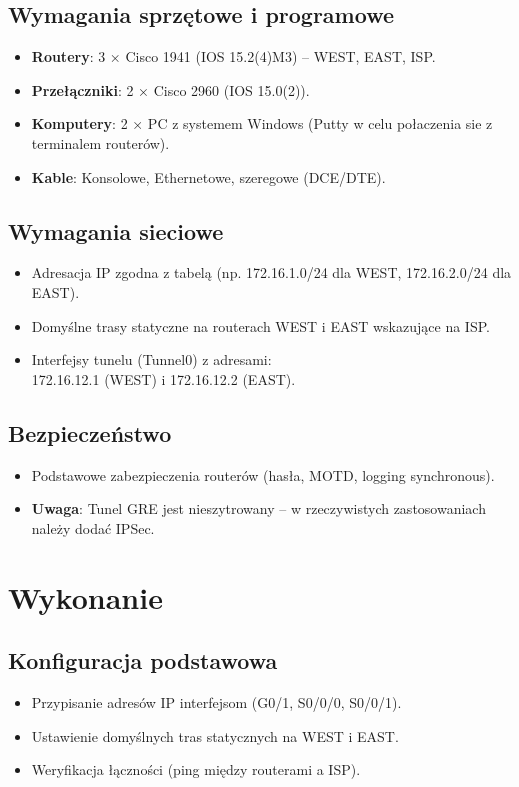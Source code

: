 \documentclass[12pt,twoside,a4paper,openany]{article}
\begin{document}
\clearpage
\subsection{Wymagania sprzętowe i programowe}
\begin{itemize}
    \item \textbf{Routery}: 3 × Cisco 1941 (IOS 15.2(4)M3) – WEST, EAST, ISP.
    \item \textbf{Przełączniki}: 2 × Cisco 2960 (IOS 15.0(2)).
    \item \textbf{Komputery}: 2 × PC z systemem Windows (Putty w celu połaczenia sie z terminalem routerów).
    \item \textbf{Kable}: Konsolowe, Ethernetowe, szeregowe (DCE/DTE).
\end{itemize}

\subsection{Wymagania sieciowe}
\begin{itemize}
    \item Adresacja IP zgodna z tabelą (np. 172.16.1.0/24 dla WEST, 172.16.2.0/24 dla EAST).    \item Domyślne trasy statyczne na routerach WEST i EAST wskazujące na ISP.
    \item Interfejsy tunelu (Tunnel0) z adresami:\\ 172.16.12.1 (WEST) i 172.16.12.2 (EAST).
\end{itemize}

\subsection{Bezpieczeństwo}
\begin{itemize}
    \item Podstawowe zabezpieczenia routerów (hasła, MOTD, logging synchronous).
    \item \textbf{Uwaga}: Tunel GRE jest nieszytrowany – w rzeczywistych zastosowaniach należy dodać IPSec.
\end{itemize}

\section{Wykonanie}

\subsection{Konfiguracja podstawowa}
\begin{itemize}
    \item Przypisanie adresów IP interfejsom (G0/1, S0/0/0, S0/0/1).
    \item Ustawienie domyślnych tras statycznych na WEST i EAST.
    \item Weryfikacja łączności (ping między routerami a ISP).
\end{itemize}
\end{document}
